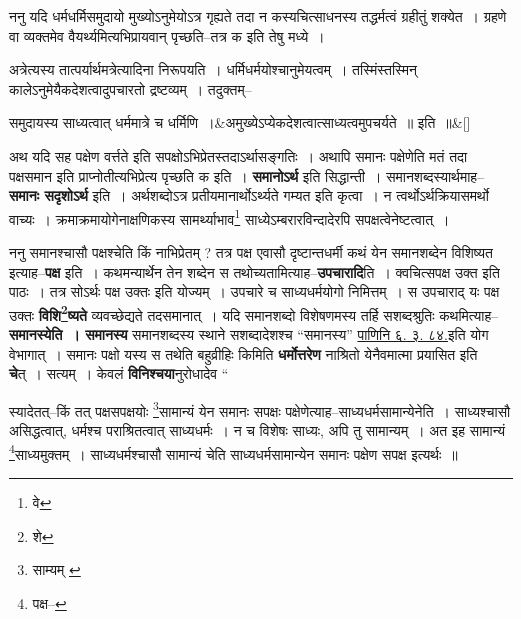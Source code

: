 \documentclass[article,12pt,a4paper]{memoir}
\begin{document}
	  \endgroup
	

	  \pstart ननु यदि धर्मधर्मिसमुदायो मुख्योऽनुमेयोऽत्र गृह्यते तदा न कस्यचित्साधनस्य तद्धर्मत्वं ग्रहीतुं शक्येत । ग्रहणे वा व्यक्तमेव वैयर्थ्यमित्यभिप्रायवान् पृच्छति--तत्र क इति तेषु मध्ये ।
	\pend
      

	  \pstart अत्रेत्यस्य तात्पर्यार्थमत्रेत्यादिना निरूपयति । धर्मिधर्मयोश्चानुमेयत्वम् । तस्मिंस्तस्मिन् कालेऽनुमेयैकदेशत्वादुपचारतो द्रष्टव्यम् । तदुक्तम्--
	\pend
      
	  \bigskip
	  \begingroup
	
	    
	    \stanza[\smallbreak]
	समुदायस्य साध्यत्वात् धर्ममात्रे च धर्मिणि ।&अमुख्येऽप्येकदेशत्वात्साध्यत्वमुपचर्यते ॥ इति ॥\&[\smallbreak]


	
	  \endgroup
	

	  \pstart अथ यदि सह पक्षेण वर्त्तते इति सपक्षोऽभिप्रेतस्तदाऽर्थासङ्गतिः । अथापि समानः पक्षेणेति मतं तदा पक्षसमान इति प्राप्नोतीत्यभिप्रेत्य पृच्छति क इति । \textbf{समानोऽर्थ} इति सिद्धान्ती । समानशब्दस्यार्थमाह--\textbf{समानः सदृशोऽर्थ} इति । अर्थशब्दोऽत्र प्रतीयमानार्थोऽर्थ्यते गम्यत इति कृत्वा । न त्वर्थोऽर्थक्रियासमर्थो वाच्यः । क्रमाक्रमायोगेनाक्षणिकस्य सामर्थ्याभाव\footnote{वे} साध्येऽम्बरारविन्दादेरपि सपक्षत्वेनेष्टत्वात् ।
	\pend
      

	  \pstart ननु समानश्चासौ पक्षश्चेति किं नाभिप्रेतम् ? तत्र पक्ष एवासौ दृष्टान्तधर्मी कथं येन समानशब्देन विशिष्यत इत्याह--\textbf{पक्ष} इति । कथमन्यार्थेन तेन शब्देन स तथोच्यतामित्याह--\textbf{उपचारादि}ति । क्वचित्सपक्ष उक्त इति पाठः । तत्र सोऽर्थः पक्ष उक्तः इति योज्यम् । उपचारे च साध्यधर्मयोगो निमित्तम् । स उपचाराद् यः पक्ष उक्तः \textbf{विशि\footnote{शे}ष्यते} व्यवच्छेद्यते तदसमानात् । यदि समानशब्दो विशेषणमस्य तर्हि सशब्दश्रुतिः कथमित्याह--\textbf{समानस्येति । समानस्य} समानशब्दस्य स्थाने सशब्दादेशश्च “समानस्य” \href{http://http://sarit.indology.info/?cref=Pā.6.3.84}{पाणिनि ६. ३. ८४.}इति योग वेभागात् । समानः पक्षो यस्य स तथेति बहुव्रीहिः किमिति \textbf{धर्मोत्तरेण} नाश्रितो येनैवमात्मा प्रयासित इति \textbf{चे}त् । सत्यम् । केवलं \textbf{विनिश्चया}नुरोधादेव  \leavevmode{} “
	  
	स्यादेतत्--किं तत् पक्षसपक्षयोः \footnote{साम्यम् \cite{dp-msB}}सामान्यं येन समानः सपक्षः पक्षेणेत्याह--साध्यधर्मसामान्येनेति । साध्यश्चासौ असिद्धत्वात्, धर्मश्च पराश्रितत्वात् साध्यधर्मः । न च विशेषः साध्यः, अपि तु सामान्यम् । अत इह सामान्यं \footnote{पक्ष--\cite{dp-msD-n}}साध्यमुक्तम् । साध्यधर्मश्चासौ सामान्यं चेति साध्यधर्मसामान्येन समानः पक्षेण सपक्ष इत्यर्थः ॥ 
	  
\end{document}
